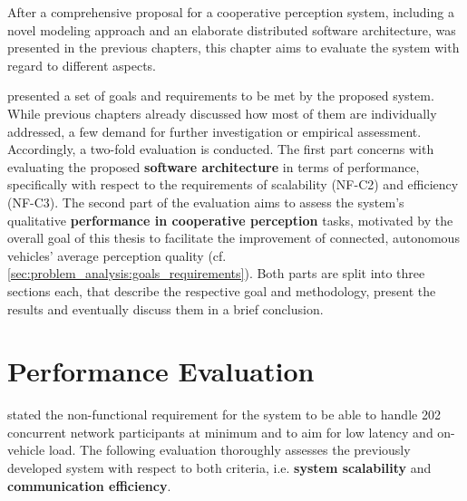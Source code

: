 After a comprehensive proposal for a cooperative perception system, including a novel modeling approach and an elaborate distributed software architecture, was presented in the previous chapters, this chapter aims to evaluate the system with regard to different aspects.

 presented a set of goals and requirements to be met by the proposed system. While previous chapters already discussed how most of them are individually addressed, a few demand for further investigation or empirical assessment. Accordingly, a two-fold evaluation is conducted. The first part concerns with evaluating the proposed \textbf{software architecture} in terms of performance, specifically with respect to the requirements of scalability (NF-C2) and efficiency (NF-C3). The second part of the evaluation aims to assess the system's qualitative \textbf{performance in cooperative perception} tasks, motivated by the overall goal of this thesis to facilitate the improvement of connected, autonomous vehicles' average perception quality (cf. \cref{sec:problem_analysis:goals_requirements}). Both parts are split into three sections each, that describe the respective goal and methodology, present the results and eventually discuss them in a brief conclusion.

\section{Performance Evaluation}
\label{sec:evaluation:performance_evaluation}
 stated the non-functional requirement for the system to be able to handle 202 concurrent network participants at minimum and to aim for low latency and on-vehicle load. The following evaluation thoroughly assesses the previously developed system with respect to both criteria, i.e. \textbf{system scalability} and \textbf{communication efficiency}.

